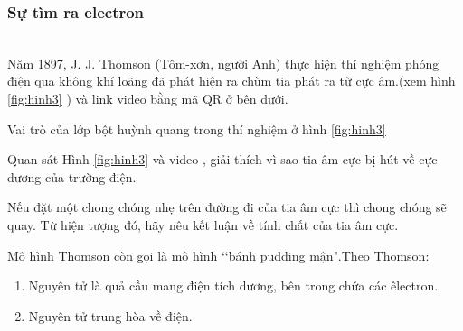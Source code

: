 \subsubsection{Sự tìm ra electron}
\\
Năm 1897, J. J. Thomson (Tôm-xơn, người Anh) thực hiện thí nghiệm phóng điện qua không khí loãng đã phát hiện ra chùm tia phát ra từ cực âm.(xem hình \ref{fig:hinh3} ) và link video bằng mã QR ở bên dưới.\\ 

\begin{hoivadap}
	\begin{cauhoi}
		Vai trò của lớp bột huỳnh quang trong thí nghiệm ở hình \ref{fig:hinh3}
	\end{cauhoi}
\end{hoivadap}

\begin{hoivadap}
	\begin{cauhoi}
		Quan sát Hình \ref{fig:hinh3} và video , giải thích vì sao tia âm cực bị hút về cực dương của trường điện.
	\end{cauhoi}
\end{hoivadap}
%
\begin{hoivadap}
	\begin{cauhoi}
		Nếu đặt một chong chóng nhẹ trên đường đi của tia âm cực thì chong chóng sẽ quay. Từ hiện tượng đó, hãy nêu kết luận về tính chất của tia âm cực.
	\end{cauhoi}
\end{hoivadap}

\begin{Bancobiet}
	Mô hình Thomson còn gọi là mô hình \lq\lq bánh pudding mận".Theo Thomson:
	\begin{enumerate}
		\item Nguyên tử là quả cầu mang điện tích dương, bên trong chứa các êlectron.
		\item Nguyên tử trung hòa về điện.
	\end{enumerate}
\end{Bancobiet}
%
%
